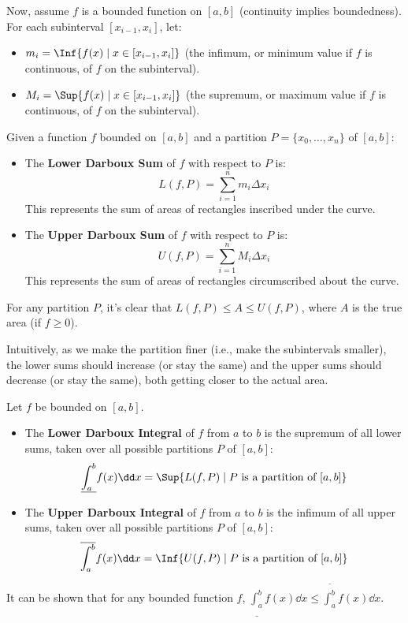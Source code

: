 Now, assume $f$ is a bounded function on $[a, b]$ (continuity implies boundedness). For each subinterval $[x_{i-1}, x_i]$, let:
\begin{itemize}
    \item $m_i = \Inf \{ f(x) \mid x \in [x_{i-1}, x_i] \}$ (the infimum, or minimum value if $f$ is continuous, of $f$ on the subinterval).
    \item $M_i = \Sup \{ f(x) \mid x \in [x_{i-1}, x_i] \}$ (the supremum, or maximum value if $f$ is continuous, of $f$ on the subinterval).
\end{itemize}

\begin{definition}
Given a function $f$ bounded on $[a, b]$ and a partition $P=\{x_0, \dots, x_n\}$ of $[a, b]$:
\begin{itemize}
    \item The \textbf{Lower Darboux Sum} of $f$ with respect to $P$ is:
      \[ L(f, P) = \sum_{i=1}^n m_i \Delta x_i \]
      This represents the sum of areas of rectangles inscribed under the curve.
    \item The \textbf{Upper Darboux Sum} of $f$ with respect to $P$ is:
      \[ U(f, P) = \sum_{i=1}^n M_i \Delta x_i \]
      This represents the sum of areas of rectangles circumscribed about the curve.
\end{itemize}
For any partition $P$, it's clear that $L(f, P) \le A \le U(f, P)$, where $A$ is the true area (if $f \ge 0$).
\end{definition}

Intuitively, as we make the partition finer (i.e., make the subintervals smaller), the lower sums should increase (or stay the same) and the upper sums should decrease (or stay the same), both getting closer to the actual area.

\begin{definition}
Let $f$ be bounded on $[a, b]$.
\begin{itemize}
    \item The \textbf{Lower Darboux Integral} of $f$ from $a$ to $b$ is the supremum of all lower sums, taken over all possible partitions $P$ of $[a, b]$:
      \[ \underline{\int_a^b} f(x) \dd x = \Sup \{ L(f, P) \mid P \text{ is a partition of } [a, b] \} \]
    \item The \textbf{Upper Darboux Integral} of $f$ from $a$ to $b$ is the infimum of all upper sums, taken over all possible partitions $P$ of $[a, b]$:
      \[ \overline{\int_a^b} f(x) \dd x = \Inf \{ U(f, P) \mid P \text{ is a partition of } [a, b] \} \]
\end{itemize}
It can be shown that for any bounded function $f$, $\underline{\int_a^b} f(x) \dd x \le \overline{\int_a^b} f(x) \dd x$.
\end{definition}

